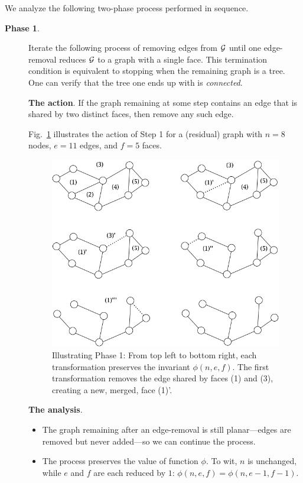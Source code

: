 \noindent
We analyze the following two-phase process performed in sequence.
\begin{description}
\item[{\bf Phase 1}.]
Iterate the following process of removing edges from $\mbox{$\cal G$}$ until one
edge-removal reduces $\mbox{$\cal G$}$ to a graph with a single face.  This
termination condition is equivalent to stopping when the remaining
graph is a tree.  One can verify that the tree one ends up with is
{\em connected}.
\bigskip

{\bf The action}.
If the graph remaining at some step contains an edge that is shared by
two distinct faces, then remove any such edge.

Fig.~\ref{fig:planarStep1} illustrates the action of Step 1 for a
(residual) graph with $n=8$ nodes, $e=11$ edges, and $f=5$ faces.
\begin{figure}[hbt]
\begin{center}
   \includegraphics[scale=0.4]{FiguresGraph/planarStep1}
\caption{Illustrating Phase 1: From top left to bottom right, each
  transformation preserves the invariant $\phi(n,e,f)$.  The first
  transformation removes the edge shared by faces (1) and (3),
  creating a new, merged, face (1)'.}
  \label{fig:planarStep1}
\end{center}
\end{figure}

\bigskip

{\bf The analysis}.
\begin{itemize}
\item
The graph remaining after an edge-removal is still planar---edges are
removed but never added---so we can continue the process.
\item
The process preserves the value of function $\phi$.  To wit, $n$ is
unchanged, while $e$ and $f$ are each reduced by $1$: $\phi(n,e,f) =
\phi(n,e-1,f-1)$.
\end{itemize}


\end{description}
